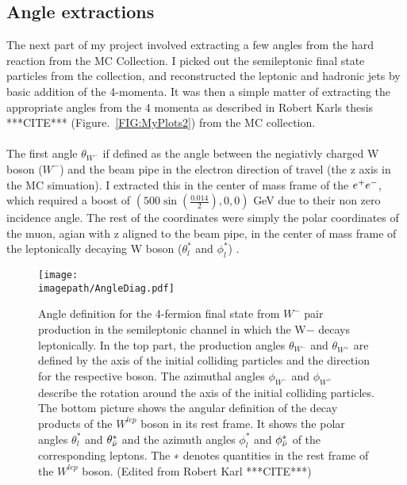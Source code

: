 \subsection{Angle extractions}
\label{angles}
The next part of my project involved extracting a few angles from the hard reaction from the MC Collection. I picked out the semileptonic final state particles from the collection, and reconstructed the leptonic and hadronic jets by basic addition of the 4-momenta. It was then a simple matter of extracting the appropriate angles from the 4 momenta as described in Robert Karls thesis ***CITE*** (Figure.~\ref{FIG:MyPlots2}) from the MC collection.
\\\\
The first angle $\theta_{W^{-}}$ if defined as the angle between the negiativly charged W boson ($W^{-}$) and the beam pipe in the electron direction of travel (the z axis in the MC simuation). I extracted this in the center of mass frame of the $e^{+}e^{-}$, which required a boost of $(500\sin{(\frac{0.014}{2})}, 0, 0)$ GeV due to their non zero incidence angle. The rest of the coordinates were simply the polar coordinates of the muon, agian with z aligned to the beam pipe, in the center of mass frame of the leptonically decaying W boson (${\theta}_{l}^{*}$ and ${\phi}_{l}^{*}$) .

\begin{figure}
    \texttt{[image: \\imagepath/AngleDiag.pdf]}
    \caption{
    Angle definition for the 4-fermion final state from ${W}^{-}$ pair production in the semileptonic channel in which the W− decays leptonically. In the top part, the production angles ${\theta}_{{W}^{-}}$ and ${\theta}_{{W}^{+}}$ are defined by the axis of the initial colliding particles and the direction for the respective boson. The azimuthal angles ${\phi}_{{W}^{-}}$ and ${\phi}_{{W}^{+}}$ describe the rotation around the axis of the initial colliding particles.\\
    The bottom picture shows the angular definition of the decay products of the ${W}^{lep}$ boson in its rest frame. It shows the polar angles ${\theta}_{l}^{*}$ and ${\theta}_{\bar{\nu}}^{*}$ and the azimuth angles ${\phi}_{l}^{*}$ and ${\phi}_{\bar{\nu}}^{*}$ of the corresponding leptons. The ∗ denotes quantities in the rest frame of the ${W}^{lep}$ boson. (Edited from Robert Karl ***CITE***)
      }
    \label{FIG:MyPlots3}
\end{figure}
